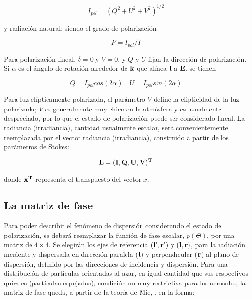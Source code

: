         \begin{equation}
         I_{pol}=(Q^{2}+U^{2}+V^{2})^{1/2}
        \label{sos:eq:lenoble6}
         \end{equation}

        \noindent y radiación natural; siendo el grado de polarización:
        
        \begin{equation}
        P=I_{pol}/I
        \label{sos:eq:lenoble7}
        \end{equation}

        Para polarización lineal, $\delta=0$ y $V=0$, y $Q$ y $U$ fijan la dirección de polarización. Si $\alpha$ es el ángulo de rotación alrededor de $\bf{k}$ que alínea $\bf{l}$ a $\bf{E}$, se tienen
        
        \begin{equation}
        Q=I_{pol}cos(2\alpha)\quad
        U=I_{pol}sin(2\alpha)
        \label{sos:eq:lenoble8}
        \end{equation}

        Para luz elípticamente polarizada, el parámetro $V$ define la elipticidad de la luz polarizada; $V$ es generalmente muy chico en la atmósfera y es usualmente despreciado, por lo que el estado de polarización puede ser considerado lineal. La radiancia (irradiancia), cantidad usualmente escalar, será convenientemente reemplazada por el vector radiancia (irradiancia), construido a partir de los parámetros de Stokes:
        
        \begin{equation}
         \bf{L}=(I,Q,U,V)^{T}
        \label{sos:eq:lenoble9}
         \end{equation}

        \noindent donde $\bf{x}^{T}$ representa el transpuesto del vector $x$.

    \subsection{La matriz de fase}
    \label{sos:s:matrizdefase}

        Para poder describir el fenómeno de dispersión considerando el estado de polarización, se deberá reemplazar la función de fase escalar, $p(\Theta)$, por una matriz de $4 \times 4$. Se elegirán los ejes de referencia $(\bf{l'},\bf{r'})$ y $(\bf{l},\bf{r})$, para la radiación incidente y dispersada en dirección paralela ($\bf{l}$) y perpendicular ($\bf{r}$) al plano de dispersión, definido por las direcciones de incidencia y dispersión. Para una distribución de partículas orientadas al azar, en igual cantidad que sus respectivos quirales (partículas espejadas), condición no muy restrictiva para los aerosoles, la matriz de fase queda, a partir de la teoría de Mie, \cite{mishchenko2002}, en la forma:
        
